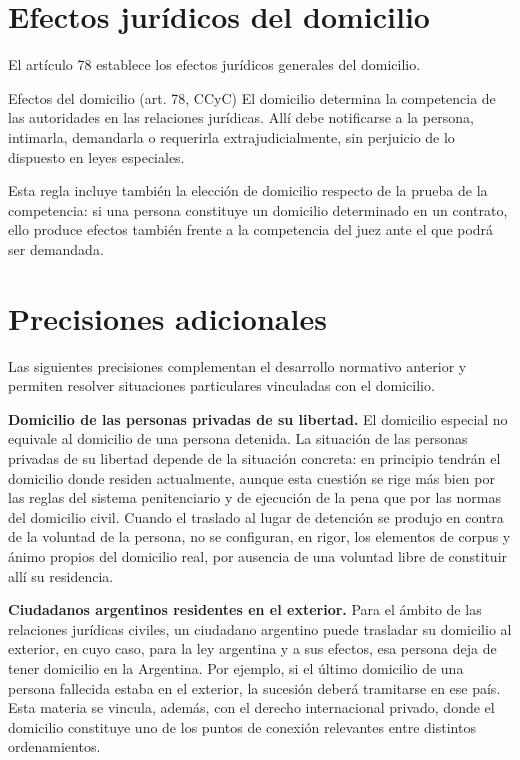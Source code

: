 \documentclass[12pt,oneside]{book}
\begin{document}
\section{Efectos jurídicos del domicilio}

El artículo 78 establece los efectos jurídicos generales del domicilio.

\begin{definition}{Efectos del domicilio (art. 78, CCyC)}
El domicilio determina la competencia de las autoridades en las relaciones jurídicas. Allí debe notificarse a la persona, intimarla, demandarla o requerirla extrajudicialmente, sin perjuicio de lo dispuesto en leyes especiales.
\end{definition}

Esta regla incluye también la elección de domicilio respecto de la prueba de la competencia: si una persona constituye un domicilio determinado en un contrato, ello produce efectos también frente a la competencia del juez ante el que podrá ser demandada.

\section{Precisiones adicionales}

Las siguientes precisiones complementan el desarrollo normativo anterior y permiten resolver situaciones particulares vinculadas con el domicilio.

\begin{note}
\textbf{Domicilio de las personas privadas de su libertad.} El domicilio especial no equivale al domicilio de una persona detenida. La situación de las personas privadas de su libertad depende de la situación concreta: en principio tendrán el domicilio donde residen actualmente, aunque esta cuestión se rige más bien por las reglas del sistema penitenciario y de ejecución de la pena que por las normas del domicilio civil. Cuando el traslado al lugar de detención se produjo en contra de la voluntad de la persona, no se configuran, en rigor, los elementos de corpus y ánimo propios del domicilio real, por ausencia de una voluntad libre de constituir allí su residencia.
\end{note}

\begin{note}
\textbf{Ciudadanos argentinos residentes en el exterior.} Para el ámbito de las relaciones jurídicas civiles, un ciudadano argentino puede trasladar su domicilio al exterior, en cuyo caso, para la ley argentina y a sus efectos, esa persona deja de tener domicilio en la Argentina. Por ejemplo, si el último domicilio de una persona fallecida estaba en el exterior, la sucesión deberá tramitarse en ese país. Esta materia se vincula, además, con el derecho internacional privado, donde el domicilio constituye uno de los puntos de conexión relevantes entre distintos ordenamientos.
\end{note}
\end{document}
